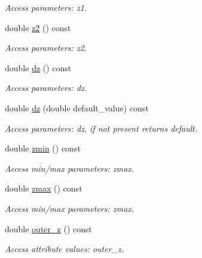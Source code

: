 \begin{DoxyCompactItemize}
\begin{DoxyCompactList}\small\item\em Access parameters: z1. \item\end{DoxyCompactList}\item 
double \hyperlink{struct_d_d4hep_1_1_x_m_l_1_1_child_value_ad6b054e5829702c9bf90f8bcafea74dd}{z2} () const 
\begin{DoxyCompactList}\small\item\em Access parameters: z2. \item\end{DoxyCompactList}\item 
double \hyperlink{struct_d_d4hep_1_1_x_m_l_1_1_child_value_ab635eee327457283092d8be149a86e7d}{dz} () const 
\begin{DoxyCompactList}\small\item\em Access parameters: dz. \item\end{DoxyCompactList}\item 
double \hyperlink{struct_d_d4hep_1_1_x_m_l_1_1_child_value_a482910356250eed75d384fe9adb3a8e5}{dz} (double default\_\-value) const 
\begin{DoxyCompactList}\small\item\em Access parameters: dz, if not present returns default. \item\end{DoxyCompactList}\item 
double \hyperlink{struct_d_d4hep_1_1_x_m_l_1_1_child_value_abfa3a9c8cdaf79f82be50a441e1ec7ca}{zmin} () const 
\begin{DoxyCompactList}\small\item\em Access min/max parameters: zmax. \item\end{DoxyCompactList}\item 
double \hyperlink{struct_d_d4hep_1_1_x_m_l_1_1_child_value_aa90d2bbccc9bc4ff6c495ef2ae2c26e5}{zmax} () const 
\begin{DoxyCompactList}\small\item\em Access min/max parameters: zmax. \item\end{DoxyCompactList}\item 
double \hyperlink{struct_d_d4hep_1_1_x_m_l_1_1_child_value_a14c4879c57f70257d777b1bf82538931}{outer\_\-z} () const 
\begin{DoxyCompactList}\small\item\em Access attribute values: outer\_\-z. \item\end{DoxyCompactList}\item 

\end{DoxyCompactItemize}
